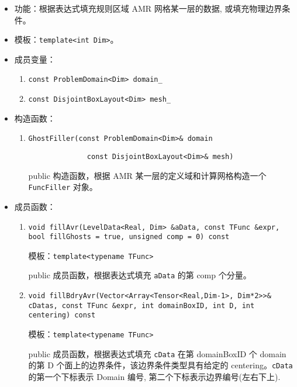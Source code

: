 \documentclass[cn, bibend=bibtex]{elegantpaper}
\theoremstyle{plain}
\begin{document}
\begin{itemize}
  \item 功能：根据表达式填充规则区域 AMR 网格某一层的数据, 或填充物理边界条件。
  \item 模板：\lstinline|template<int Dim>|。
  \item 成员变量：
  \begin{enumerate}
    \item \lstinline|const ProblemDomain<Dim> domain_|
    \item \lstinline|const DisjointBoxLayout<Dim> mesh_|
  \end{enumerate}
  \item 构造函数：
  \begin{enumerate}
    \item \lstinline|GhostFiller(const ProblemDomain<Dim>& domain|
    
          \lstinline|              const DisjointBoxLayout<Dim>& mesh)|

    public 构造函数，根据 AMR 某一层的定义域和计算网格构造一个 \lstinline|FuncFiller| 对象。
  \end{enumerate}
  \item 成员函数：
  \begin{enumerate}
    \item \lstinline|void fillAvr(LevelData<Real, Dim> &aData, const TFunc &expr, bool fillGhosts = true, unsigned comp = 0) const|

    模板：\lstinline|template<typename TFunc>|

    public 成员函数，根据表达式填充 \lstinline|aData| 的第 comp 个分量。



    \item \lstinline|void fillBdryAvr(Vector<Array<Tensor<Real,Dim-1>, Dim*2>>& cDatas, const TFunc &expr, int domainBoxID, int D, int centering) const|
    
    模板：\lstinline|template<typename TFunc>|

    public 成员函数，根据表达式填充 \lstinline|cData| 在第 domainBoxID 个 domain 的第 D 个面上的边界条件，该边界条件类型具有给定的 centering。\lstinline|cData| 的第一个下标表示 Domain 编号, 第二个下标表示边界编号(左右下上).


\end{enumerate}
\end{itemize}
\end{document}
